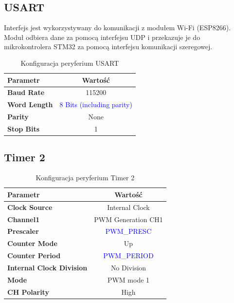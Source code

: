 \documentclass[10pt, a4paper]{article}
\begin{document}
\subsection{USART}

Interfejs jest wykorzystywany do komunikacji z modułem Wi-Fi (ESP8266). Moduł odbiera dane za pomocą interfejsu UDP i przekazuje je do mikrokontrolera STM32 za pomocą interfejsu komunikacji szeregowej.

\begin{table}[H]
	\centering
	\begin{tabular}{|l|c|} \hline
		\textbf{Parametr} & Wartość \\
		\hline
		\hline  \textbf{Baud Rate}&115200  \\\hline
		\textbf{Word Length } & \textcolor{blue}{8 Bits (including parity)}\\\hline
		\textbf{Parity} &  None\\
		\hline
		\textbf{Stop Bits}& 1\\
		\hline
	\end{tabular}
	\caption{Konfiguracja peryferium USART}
	\label{tab:USART}
\end{table}

\subsection{Timer 2}

\begin{table}[H]
	\centering
	\begin{tabular}{|l|c|} \hline
		\textbf{Parametr} & Wartość \\
		\hline
		\hline  \textbf{Clock Source}&Internal Clock  \\\hline
		\textbf{Channel1} & PWM Generation CH1\\\hline
		\textbf{Prescaler} & \textcolor{blue}{PWM\_PRESC}\\\hline
		\textbf{Counter Mode} &  Up\\
		\hline
		\textbf{Counter Period}& \textcolor{blue}{PWM\_PERIOD}\\\hline
		\textbf{Internal Clock Division}& No Division\\
		\hline
		\textbf{Mode}& PWM mode 1\\
		\hline
		\textbf{CH Polarity}& High\\
		\hline
	\end{tabular}
	\caption{Konfiguracja peryferium Timer 2}
	\label{tab:Timer2}
\end{table}
\end{document}
